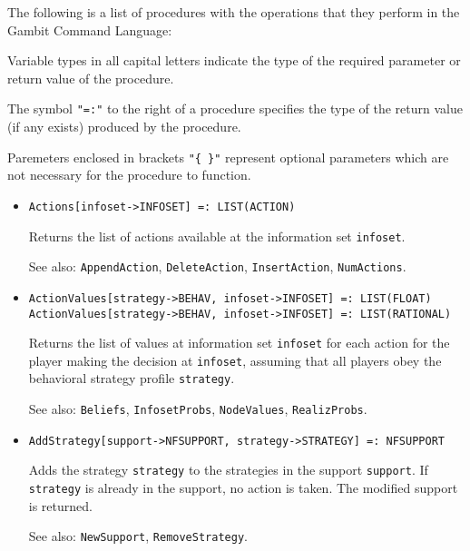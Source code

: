 The following is a list of procedures with the operations that they
perform in the Gambit Command Language:

Variable types in all capital letters indicate the type of the
required parameter or return value of the procedure.

The symbol {\tt "=:"} to the right of a procedure specifies the type
of the return value (if any exists) produced by the procedure.

Paremeters enclosed in brackets {\tt "\{ \}"} represent optional
parameters which are not necessary for the procedure to function.

\begin{itemize}


\item
\protect \large \begin{verbatim} 
Actions[infoset->INFOSET] =: LIST(ACTION)
\end{verbatim}\normalsize

\bd
Returns the list of actions available at the information set
\verb+infoset+.
\item
[See also:] {\tt AppendAction}, {\tt DeleteAction}, {\tt InsertAction},
{\tt NumActions}.
\ed

\item
\protect \large \begin{verbatim}
ActionValues[strategy->BEHAV, infoset->INFOSET] =: LIST(FLOAT)
ActionValues[strategy->BEHAV, infoset->INFOSET] =: LIST(RATIONAL)
\end{verbatim}\normalsize

\bd
Returns the list of values at information set \verb+infoset+ for each
action for the player making the decision at \verb+infoset+, assuming that
all players obey the behavioral strategy profile \verb+strategy+.
\item
[See also:] {\tt Beliefs}, {\tt InfosetProbs}, {\tt NodeValues},
{\tt RealizProbs}.
\ed

\item
\protect \large \begin{verbatim}
AddStrategy[support->NFSUPPORT, strategy->STRATEGY] =: NFSUPPORT
\end{verbatim}\normalsize

\bd
Adds the strategy \verb+strategy+ to the
strategies in the support \verb+support+.  If \verb+strategy+ is already in the
support, no action is taken.  The modified support is returned.
\item
[See also:] {\tt NewSupport}, {\tt RemoveStrategy}.
\ed


\end{itemize}
